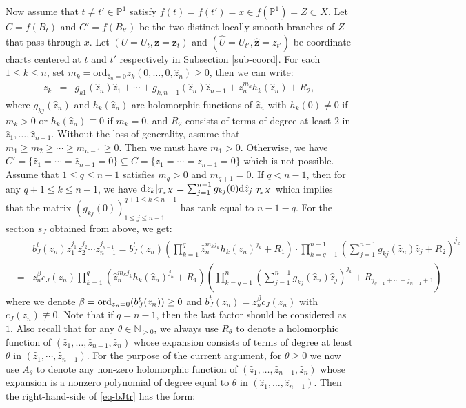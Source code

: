 \documentclass[12pt]{amsart}
\theoremstyle{definition}
\def\ord{{\rm ord}}
\def\dif{{\rm d}}
\def\ord{{\rm ord}}
\def\bz{{\mathbf{z}}}
\newcommand{\IP}{{\mathbb P}}
\begin{document}
Now assume that $t\neq t'\in \IP^1$ satisfy $f(t)=f(t')=x\in f(\IP^1)=Z\subset X$. 
Let $C=f(B_t)$ and $C'=f(B_{t'})$ be the two distinct locally smooth branches of $Z$ that pass
through $x$. Let $(U=U_t, \bz=\bz_t)$ and $(\hat{U}=U_{t'}, \hat{\bz}=z_{t'})$ be coordinate charts centered at $t$ and $t'$ respectively in Subsection \ref{sub-coord}. 
For each $1\le k\le n$, set $m_k=\mathrm{ord}_{\hat{z}_n=0}z_k(0,\dots, 0, \hat{z}_n)\ge 0$, then we can write:
\begin{eqnarray*}    z_k&=&g_{k1}(\hat{z}_n)\hat{z}_1+\cdots+g_{k,{n-1}}(\hat{z}_n)\hat{z}_{n-1}+\hat{z}_n^{m_k} h_k(\hat{z}_n)+R_2, %
\end{eqnarray*}
where $g_{kj}(\hat{z}_n)$ and $h_k(\hat{z}_n)$ are holomorphic functions of $\hat{z}_n$ with $h_k(0)\neq 0$ if $m_k>0$ or $h_k(\hat{z}_n)\equiv 0$ if $m_k=0$, and $R_2$ consists of terms of degree at least $2$ in $\hat{z}_1, \dots, \hat{z}_{n-1}$. 
Without the loss of generality, assume that $m_1\ge m_2\ge \cdots \ge m_{n-1}\ge 0$. Then we must have $m_1>0$. Otherwise, we have $C'=\{\hat{z}_1=\cdots=\hat{z}_{n-1}=0\}\subseteq C=\{z_1=\cdots=z_{n-1}=0\}$ which is not possible. Assume that $1\le q\le n-1$ satisfies $m_{q}>0$ and $m_{q+1}=0$. If $q<n-1$, then for any $q+1\le k\le n-1$, we have $\dif z_k|_{T_xX}=\sum_{j=1}^{n-1} g_{kj}(0) \dif \hat{z}_j|_{T_xX}$ which implies that the matrix $(g_{kj}(0))^{q+1\le k\le n-1}_{1\le j\le n-1}$ has rank equal to $n-1-q$. 
For the section $s_J$ obtained from above, we get: 
\begin{eqnarray}\label{eq-bJtr}
    &&b^t_J(z_n) z_1^{j_1}z_2^{j_2}\cdots z_{n-1}^{j_{n-1}}=b^{t}_J(z_n) (\prod_{k=1}^q \hat{z}_n^{m_k j_k} h_k(\hat{z}_n)^{j_k}+R_1)\cdot \prod_{k=q+1}^{n-1}
    \left(\sum_{j=1}^{n-1} g_{kj}(\hat{z}_n) \hat{z}_j+R_2\right)^{j_k}\\
    &=&z_n^{\beta} c_J(z_n)\prod_{k=1}^q 
    (\hat{z}_n^{m_kj_k}h_k(\hat{z}_n)^{j_k}+R_1) 
    \left(\prod_{k=q+1}^n \left(\sum_{j=1}^{n-1}g_{kj}(\hat{z}_n)\hat{z}_j\right)^{j_k}+R_{{j_{q-1}}+\cdots+j_{n-1}+1}\right)\nonumber 
\end{eqnarray}
where we denote $\beta=\ord_{z_n=0}(b^t_J(z_n))\ge 0$ and $b^t_J(z_n)=z_n^\beta c_J(z_n)$ with $c_J(z_n)\not\equiv 0$. 
Note that if $q=n-1$, then the last factor should be considered as $1$. 
Also recall that for any $\theta\in \mathbb{N}_{>0}$, 
we always use $R_{\theta}$ to denote a holomorphic function of $(\hat{z}_1, \dots, \hat{z}_{n-1}, \hat{z}_n)$ whose expansion consists of terms of degree at least $\theta$ in $(\hat{z}_1,\cdots, \hat{z}_{n-1})$. For the purpose of the current argument, for $\theta\ge 0$ we now use $A_\theta$ to denote any non-zero holomorphic function of $(\hat{z}_1, \dots, \hat{z}_{n-1}, \hat{z}_n)$ whose expansion is a nonzero polynomial of degree equal to $\theta$ in $(\hat{z}_1,\dots, \hat{z}_{n-1})$. Then the right-hand-side of \eqref{eq-bJtr} has the form:
\end{document}

